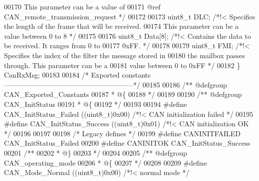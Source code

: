 \begin{DoxyCode}
00170 \textcolor{comment}{                        This parameter can be a value of }
00171 \textcolor{comment}{                        @ref CAN\_remote\_transmission\_request */}
00172 
00173   uint8\_t DLC;     \textcolor{comment}{/*!< Specifies the length of the frame that will be received.}
00174 \textcolor{comment}{                        This parameter can be a value between 0 to 8 */}
00175 
00176   uint8\_t Data[8]; \textcolor{comment}{/*!< Contains the data to be received. It ranges from 0 to }
00177 \textcolor{comment}{                        0xFF. */}
00178 
00179   uint8\_t FMI;     \textcolor{comment}{/*!< Specifies the index of the filter the message stored in }
00180 \textcolor{comment}{                        the mailbox passes through. This parameter can be a }
00181 \textcolor{comment}{                        value between 0 to 0xFF */}
00182 \} CanRxMsg;
00183 
00184 \textcolor{comment}{/* Exported constants --------------------------------------------------------*/}
00185 
00186 \textcolor{comment}{/** @defgroup CAN\_Exported\_Constants}
00187 \textcolor{comment}{  * @\{}
00188 \textcolor{comment}{  */}
00189 
00190 \textcolor{comment}{/** @defgroup CAN\_InitStatus }
00191 \textcolor{comment}{  * @\{}
00192 \textcolor{comment}{  */}
00193 
00194 \textcolor{preprocessor}{#}\textcolor{preprocessor}{define} \textcolor{preprocessor}{CAN\_InitStatus\_Failed}              \textcolor{preprocessor}{(}\textcolor{preprocessor}{(}\textcolor{preprocessor}{uint8\_t}\textcolor{preprocessor}{)}0x00\textcolor{preprocessor}{)} \textcolor{comment}{/*!< CAN initialization failed */}
00195 \textcolor{preprocessor}{#}\textcolor{preprocessor}{define} \textcolor{preprocessor}{CAN\_InitStatus\_Success}             \textcolor{preprocessor}{(}\textcolor{preprocessor}{(}\textcolor{preprocessor}{uint8\_t}\textcolor{preprocessor}{)}0x01\textcolor{preprocessor}{)} \textcolor{comment}{/*!< CAN initialization OK */}
00196 
00197 
00198 \textcolor{comment}{/* Legacy defines */}
00199 \textcolor{preprocessor}{#}\textcolor{preprocessor}{define} \textcolor{preprocessor}{CANINITFAILED}    CAN_InitStatus_Failed
00200 \textcolor{preprocessor}{#}\textcolor{preprocessor}{define} \textcolor{preprocessor}{CANINITOK}        CAN_InitStatus_Success
00201 \textcolor{comment}{/**}
00202 \textcolor{comment}{  * @\}}
00203 \textcolor{comment}{  */}
00204 
00205 \textcolor{comment}{/** @defgroup CAN\_operating\_mode }
00206 \textcolor{comment}{  * @\{}
00207 \textcolor{comment}{  */}
00208 
00209 \textcolor{preprocessor}{#}\textcolor{preprocessor}{define} \textcolor{preprocessor}{CAN\_Mode\_Normal}             \textcolor{preprocessor}{(}\textcolor{preprocessor}{(}\textcolor{preprocessor}{uint8\_t}\textcolor{preprocessor}{)}0x00\textcolor{preprocessor}{)}  \textcolor{comment}{/*!< normal mode */}

\end{DoxyCode}
